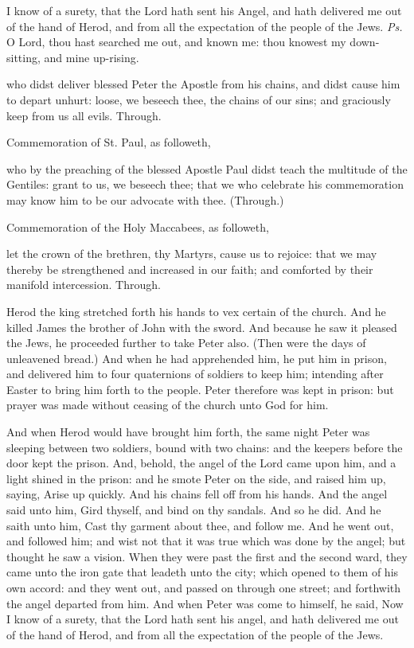 \introit
{} I know of a surety, that the Lord hath sent his Angel, and hath delivered me out of the hand of Herod, and from all the expectation of the people of the Jews. \textit{Ps.} O Lord, thou hast searched me out, and known me: thou knowest my down-sitting, and mine up-rising.


\collect
{} who didst deliver blessed Peter the Apostle from his chains, and didst cause him to depart unhurt: loose, we beseech thee, the chains of our sins; and graciously keep from us all evils. Through.

\begin{rubric}
	 Commemoration of St. Paul, as followeth,
\end{rubric}
 who by the preaching of the blessed Apostle Paul didst teach the multitude of the Gentiles: grant to us, we beseech thee; that we who celebrate his commemoration may know him to be our advocate with thee. (Through.)

\begin{rubric}
	 Commemoration of the Holy Maccabees, as followeth,
\end{rubric}
 let the crown of the brethren, thy Martyrs, cause us to rejoice: that we may thereby be strengthened and increased in our faith; and comforted by their manifold intercession. Through.

 Herod the king stretched forth his hands to vex certain of the church. And he killed James the brother of John with the sword. And because he saw it pleased the Jews, he proceeded further to take Peter also. (Then were the days of unleavened bread.) And when he had apprehended him, he put him in prison, and delivered him to four quaternions of soldiers to keep him; intending after Easter to bring him forth to the people. Peter therefore was kept in prison: but prayer was made without ceasing of the church unto God for him.

And when Herod would have brought him forth, the same night Peter was sleeping between two soldiers, bound with two chains: and the keepers before the door kept the prison. And, behold, the angel of the Lord came upon him, and a light shined in the prison: and he smote Peter on the side, and raised him up, saying, Arise up quickly. And his chains fell off from his hands. And the angel said unto him, Gird thyself, and bind on thy sandals. And so he did. And he saith unto him, Cast thy garment about thee, and follow me. And he went out, and followed him; and wist not that it was true which was done by the angel; but thought he saw a vision. When they were past the first and the second ward, they came unto the iron gate that leadeth unto the city; which opened to them of his own accord: and they went out, and passed on through one street; and forthwith the angel departed from him. And when Peter was come to himself, he said, Now I know of a surety, that the Lord hath sent his angel, and hath delivered me out of the hand of Herod, and from all the expectation of the people of the Jews.

